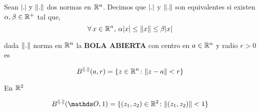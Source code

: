 
Sean $\abs{.} \text{ y } \norm{.} $ dos normas en $\mathbb{R}^{n}$. Decimos que $\abs{.}$ y $\norm{.}$ son equivalentes si existen $\alpha, \beta \in \mathbb{R}^{+}$ tal que,
$$
\forall\, x \in \mathbb{R}^{n}, \, \alpha \abs{x} \leq \norm{x}\leq\beta \abs{x}
$$

dada $\norm{.}$ norma en $\mathbb{R}^{n}$ la \textbf{BOLA ABIERTA } con centro en $a \in \mathbb{R}^{n}$ y radio $r>0$ es

$$
B^{\norm{.}} (a,r) = \{z \in \mathbb{R}^{n}\colon \norm{z-a} < r\} 
$$

En $\mathbb{R}^{2}$

$$
B^{\norm{.}} (\Ou,1) = \{(z_1, z_2) \in \Real{2} \colon \norm{(z_1, z_2)} < 1\} 
$$

